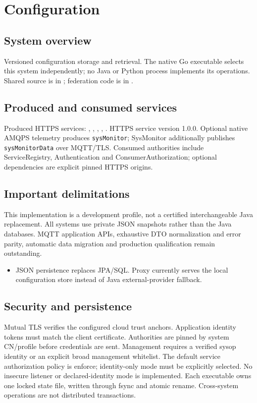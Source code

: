 \documentclass[a4paper]{arrowhead}
\begin{document}
\ArrowheadSetup
\section{Configuration}
\subsection{System overview}
Versioned configuration storage and retrieval. The native Go executable selects this system independently; no Java or Python process implements its operations. Shared source is in ; federation code is in .
\subsection{Produced and consumed services}
Produced HTTPS services: , \allowbreak {}, \allowbreak {}, \allowbreak {}, \allowbreak {}.
HTTPS service version 1.0.0. Optional native AMQPS telemetry produces \texttt{sysMonitor}; SysMonitor additionally publishes \texttt{sysMonitorData} over MQTT/TLS. Consumed authorities include ServiceRegistry, Authentication and ConsumerAuthorization; optional dependencies are explicit pinned HTTPS origins.
\subsection{Important delimitations}
This implementation is a development profile, not a certified interchangeable Java replacement. All systems use private JSON snapshots rather than the Java databases. MQTT application APIs, exhaustive DTO normalization and error parity, automatic data migration and production qualification remain outstanding.
\begin{itemize}
\item JSON persistence replaces JPA/SQL. Proxy currently serves the local configuration store instead of Java external-provider fallback.
\end{itemize}
\subsection{Security and persistence}
Mutual TLS verifies the configured cloud trust anchors. Application identity tokens must match the client certificate. Authorities are pinned by system CN/profile before credentials are sent. Management requires a verified sysop identity or an explicit broad management whitelist. The default service authorization policy is enforce; identity-only mode must be explicitly selected. No insecure listener or declared-identity mode is implemented. Each executable owns one locked state file, written through fsync and atomic rename. Cross-system operations are not distributed transactions.
\end{document}
